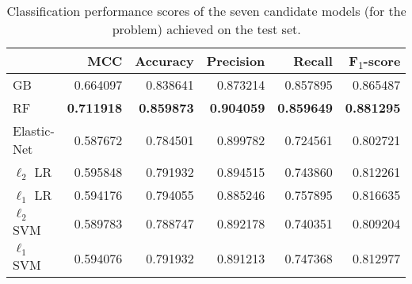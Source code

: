 \begin{table}
\centering
\begin{tabular}{lrrrrr}
\toprule
{} &       MCC &  Accuracy &  Precision &    Recall &        F\textsubscript{$1$}-score \\
\midrule
GB      &  0.664097 &  0.838641 &   0.873214 &  0.857895 &  0.865487 \\
RF         &  \textbf{0.711918} &  \textbf{0.859873} &   \textbf{0.904059} &  \textbf{0.859649} &  \textbf{0.881295} \\
Elastic-Net                   &  0.587672 &  0.784501 &   0.899782 &  0.724561 &  0.802721 \\
$\ell_2$ LR &  0.595848 &  0.791932 &   0.894515 &  0.743860 &  0.812261 \\
$\ell_1$ LR &  0.594176 &  0.794055 &   0.885246 &  0.757895 &  0.816635 \\
$\ell_2$ SVM          &  0.589783 &  0.788747 &   0.892178 &  0.740351 &  0.809204 \\
$\ell_1$ SVM          &  0.594076 &  0.791932 &   0.891213 &  0.747368 &  0.812977 \\
\bottomrule
\end{tabular}

\caption{Classification performance scores of the seven candidate models (for the \F problem) achieved on the test set.} \label{tab:f_final_scores}
\end{table}
